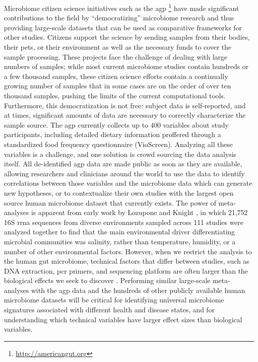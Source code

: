 Microbiome citizen science initiatives such as the \gls{agp} \footnote{\label{agpurl}\url{http://americangut.org}} have made significant contributions to the field by “democratizing” microbiome research and thus providing large-scale datasets that can be used as comparative frameworks for other studies. Citizens support the science by sending samples from their bodies, their pets, or their environment as well as the necessary funds to cover the sample processing. These projects face the challenge of dealing with large numbers of samples; while most current microbiome studies contain hundreds or a few thousand samples, these citizen science efforts contain a continually growing number of samples that in some cases are on the order of over ten thousand samples, pushing the limits of the current computational tools. Furthermore, this democratization is not free: subject data is self-reported, and at times, significant amounts of data are necessary to correctly characterize the sample source. The \gls{agp} currently collects up to 400 variables about study participants, including detailed dietary information proffered through a standardized food frequency questionnaire (VioScreen). Analyzing all these variables is a challenge, and one solution is crowd sourcing the data analysis itself. All de-identified \gls{agp} data are made public as soon as they are available, allowing researchers and clinicians around the world to use the data to identify correlations between those variables and the microbiome data which can generate new hypotheses, or to contextualize their own studies with the largest open source human microbiome dataset that currently exists. The power of meta-analyses is apparent from early work by Lozupone and Knight \cite{Lozupone2007}, in which 21,752 16S \gls{rrna} sequences from diverse environments sampled across 111 studies were analyzed together to find that the main environmental driver differentiating microbial communities was salinity, rather than temperature, humidity, or a number of other environmental factors. However, when we restrict the analysis to the human gut microbiome, technical factors that differ between studies, such as DNA extraction, \gls{pcr} primers, and sequencing platform are often larger than the biological effects we seek to discover \cite{Lozupone2013}. Performing similar large-scale meta-analyses with the \gls{agp} data and the hundreds of other publicly available human microbiome datasets will be critical for identifying universal microbiome signatures associated with different health and disease states, and for understanding which technical variables have larger effect sizes than biological variables.
